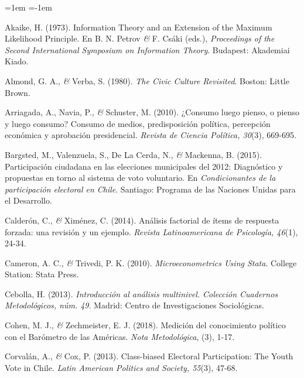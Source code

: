 \documentclass[a4paper]{tufte-handout}
\begin{document}
\begin{list}{}%
{\leftmargin=1em \itemindent=-1em}

\item{\small Akaike, H. (1973). Information Theory and an Extension of the Maximum Likelihood Principle. En B. N. Petrov {\itshape \&} F. Csáki (eds.), {\itshape Proceedings of the Second International Symposium on Information Theory}. Budapest: Akademiai Kiado.}

\item{\small Almond, G. A., {\itshape \&} Verba, S. (1980). {\itshape The Civic Culture Revisited}. Boston: Little Brown.}

\item{\small Arriagada, A., Navia, P., {\itshape \&} Schuster, M. (2010). ¿Consumo luego pienso, o pienso y luego consumo? Consumo de medios, predisposición política, percepción económica y aprobación presidencial. {\itshape Revista de Ciencia Política, 30}(3), 669-695.}

\item{\small Bargsted, M., Valenzuela, S., De La Cerda, N., {\itshape \&} Mackenna, B. (2015). Participación ciudadana en las elecciones municipales del 2012: Diagnóstico y propuestas en torno al sistema de voto voluntario. En {\itshape Condicionantes de la participación electoral en Chile}. Santiago: Programa de las Naciones Unidas para el Desarrollo.}

\item{\small Calderón, C., {\itshape \&} Ximénez, C. (2014). Análisis factorial de ítems de respuesta forzada: una revisión y un ejemplo. {\itshape Revista Latinoamericana de Psicología, 46}(1), 24-34.}

\item{\small Cameron, A. C., {\itshape \&} Trivedi, P. K. (2010). {\itshape Microeconometrics Using Stata}. College Station: Stata Press.}

\item{\small Cebolla, H. (2013). {\itshape Introducción al análisis multinivel. Colección Cuadernos Metodológicos, núm. 49}. Madrid: Centro de Investigaciones Sociológicas.}

\item{\small Cohen, M. J., {\itshape \&} Zechmeister, E. J. (2018). Medición del conocimiento político con el Barómetro de las Américas. {\itshape Nota Metodológica}, (3), 1-17.}

\item{\small Corvalán, A., {\itshape \&} Cox, P. (2013). Class-biased Electoral Participation: The Youth Vote in Chile. {\itshape Latin American Politics and Society, 55}(3), 47-68.}


\end{list}
\end{document}
